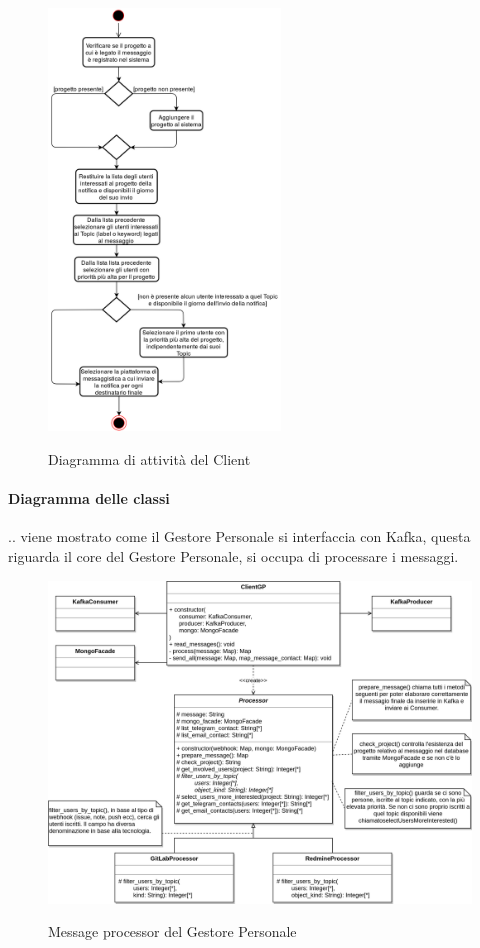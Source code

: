 \begin{figure}[H]
    \centering
    \includegraphics[width=0.55\textwidth]{img/Client_attivita.png}\\
    \caption{Diagramma di attività del Client}
\end{figure}

    \paragraph{Diagramma delle classi}
    .. viene mostrato come il Gestore Personale si interfaccia con Kafka, questa riguarda il core del Gestore Personale, si occupa di processare
    i messaggi.

    \begin{figure}[H]
        \centering
        \includegraphics[width=\textwidth]{img/GP-Processor.png}\\
        \caption{Message processor del Gestore Personale}
        \label{fig:GP-Processor}
    \end{figure}




